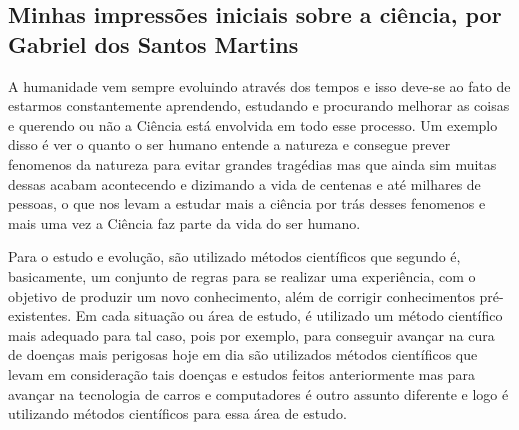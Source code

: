 \subsection{Minhas impressões iniciais sobre a ciência, por Gabriel dos Santos Martins}

A humanidade vem sempre evoluindo através dos tempos e isso deve-se ao fato de estarmos constantemente aprendendo, estudando e procurando melhorar as coisas e querendo ou não a \gls{Ciência} está envolvida em todo esse processo. Um exemplo disso é ver o quanto o ser humano entende a natureza e consegue prever \gls{fenomeno}s da natureza para evitar grandes tragédias mas que ainda sim muitas dessas acabam acontecendo e dizimando a vida de centenas e até milhares de pessoas, o que nos levam a estudar mais a ciência por trás desses \gls{fenomeno}s e mais uma vez a \gls{Ciência} faz parte da vida do ser humano. 

Para o estudo e evolução, são utilizado métodos científicos que segundo \citep{gnipper_o_nodate} é, basicamente, um conjunto de regras para se realizar uma experiência, com o objetivo de produzir um novo conhecimento, além de corrigir conhecimentos pré-existentes.
Em cada situação ou área de estudo, é utilizado um método científico mais adequado para tal caso, pois por exemplo, para conseguir avançar na cura de doenças mais perigosas hoje em dia são utilizados métodos científicos que levam em consideração tais doenças e estudos feitos anteriormente mas para avançar na tecnologia de carros e computadores é outro assunto diferente e logo é utilizando métodos científicos para essa área de estudo. 